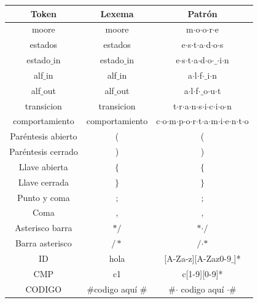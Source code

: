 \documentclass[12pt,a4paper]{article}
\begin{document}
{	\begin{center}
		\begin{tabular}{|c|c|c|}
			\hline 
			\textbf{Token} & \textbf{Lexema} & \textbf{Patrón} \\ 
			\hline 
			moore & moore & m$\cdot$o$\cdot$o$\cdot$r$\cdot$e  \\ 
			\hline 
			estados &estados & e$\cdot$s$\cdot$t$\cdot$a$\cdot$d$\cdot$o$\cdot$s \\ 
			\hline 
			estado$\_$in & estado$\_$in & e$\cdot$s$\cdot$t$\cdot$a$\cdot$d$\cdot$o$\cdot$$\_$$\cdot$i$\cdot$n \\ 
			\hline 
			alf$\_$in	& alf$\_$in & a$\cdot$l$\cdot$f$\cdot$$\_$i$\cdot$n \\ 
			\hline 
				alf$\_$out	& alf$\_$out & a$\cdot$l$\cdot$f$\cdot$$\_$o$\cdot$u$\cdot$t \\ 
			\hline 
				transicion	& transicion & t$\cdot$r$\cdot$a$\cdot$n$\cdot$s$\cdot$i$\cdot$c$\cdot$i$\cdot$o$\cdot$n \\ 
			\hline 
				comportamiento	& comportamiento & c$\cdot$o$\cdot$m$\cdot$p$\cdot$o$\cdot$r$\cdot$t$\cdot$a$\cdot$m$\cdot$i$\cdot$e$\cdot$n$\cdot$t$\cdot$o \\ 
			\hline 
			Paréntesis abierto	& ( & ( \\ 
			\hline 
			Paréntesis cerrado	& ) & ) \\ 
			\hline 
			Llave abierta	& $\{$ & $\{$ \\ 
			\hline 
			Llave cerrada	& $\}$ & $\}$ \\ 
			\hline 
			Punto y coma	& ; & ; \\ 
			\hline 
			Coma	& , &  , \\ 
			\hline
			Asterisco barra & $\ast/$  & $\ast$$\cdot/$ \\ 
			\hline 
			Barra asterisco & $/\ast$  &  $/$$\cdot$$\ast$ \\ 
			\hline  
			ID	& hola  & [A-Za-z][A-Zaz0-9$\_$]* \\ 
			\hline 
			CMP	& c1 & c[1-9][0-9]* \\ 
			\hline
		    CODIGO	& $\#$codigo aquí $\#$  & $\#$$\cdot$ codigo aquí $\cdot$$\#$\\ 
			\hline
			
		
	
		\end{tabular} 	
	\end{center}
	\newpage
}
\end{document}
